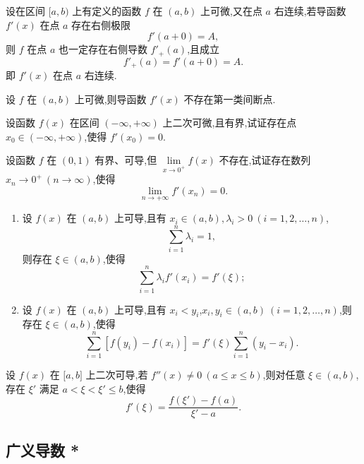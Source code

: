 \documentclass[../数学分析培优讲义.tex]{subfiles}
\begin{document}
\begin{theorem}
设在区间 $\lbrack a,b)$ 上有定义的函数 $f$ 在 $(a,b)$ 上可微,又在点 $a$ 右连续,若导函数 $f'(x)$ 在点 $a$ 存在右侧极限
\[
    f'(a+0)=A,
\]
则 $f$ 在点 $a$ 也一定存在右侧导数 $f'_+(a)$,且成立
\[
    f'_+(a)=f'(a+0)=A.
\]
即 $f'(x)$ 在点 $a$ 右连续.
\end{theorem}

\begin{corollary}[\markstar]
设 $f$ 在 $(a,b)$ 上可微,则导函数 $f'(x)$ 不存在第一类间断点.
\end{corollary}

\begin{example}
设函数 $f(x)$ 在区间 $(-\infty,+\infty)$ 上二次可微,且有界,试证存在点 $x_0\in(-\infty,+\infty)$,使得 $f'(x_0)=0$.
\end{example}
\exampleblank

\begin{example}
设函数 $f$ 在 $(0,1)$ 有界、可导,但 $\displaystyle\lim\limits_{x\to0^+}f(x)$ 不存在,试证存在数列 $x_n\to0^+\ (n\to\infty)$,使得
\[
    \lim\limits_{n\to+\infty}f'(x_n)=0.
\]
\end{example}
\exampleblank

\begin{example}
\begin{enumerate}[label=(\arabic*)]
    \item 设 $f(x)$ 在 $(a,b)$ 上可导,且有 $x_i\in(a,b),\lambda_i>0\ (i=1,2,\ldots,n)$,
    \[
        \sum\limits_{i=1}^n\lambda_i=1,
    \]
    则存在 $\xi\in(a,b)$,使得
    \[
        \sum\limits_{i=1}^n\lambda_i f'(x_i)=f'(\xi);
    \]
    \item 设 $f(x)$ 在 $(a,b)$ 上可导,且有 $x_i<y_i$,$x_i,y_i\in(a,b)\ (i=1,2,\ldots,n)$,则存在 $\xi\in(a,b)$,使得
    \[
        \sum\limits_{i=1}^n[f(y_i)-f(x_i)]
        =f'(\xi)\sum\limits_{i=1}^n(y_i-x_i).
    \]
\end{enumerate}
\end{example}
\exampleblank

\begin{example}
设 $f(x)$ 在 $\lbrack a,b\rbrack$ 上二次可导,若 $f''(x)\neq0\ (a\leq x\leq b)$,则对任意 $\xi\in(a,b)$,存在 $\xi'$ 满足 $a<\xi<\xi'\leq b$,使得
\[
    f'(\xi)=\dfrac{f(\xi')-f(a)}{\xi'-a}.
\]
\end{example}
\exampleblank


\newpage

\subsection{广义导数 *}
\end{document}
